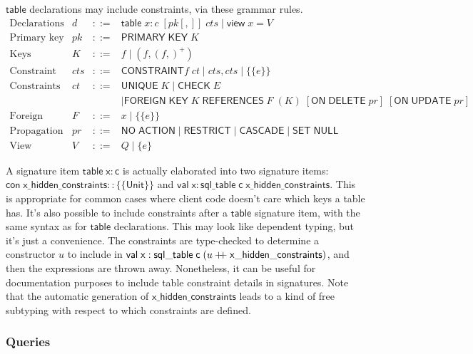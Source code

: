 \documentclass{article}
\newcommand{\mt}[1]{\mathsf{#1}}
\newcommand{\rc}{+ \hspace{-.075in} + \;}
\begin{document}
$\mt{table}$ declarations may include constraints, via these grammar rules.
$$\begin{array}{rrcll}
  \textrm{Declarations} & d &::=& \mt{table} \; x : c \; [pk[,]] \; cts \mid \mt{view} \; x = V \\
  \textrm{Primary key constraints} & pk &::=& \mt{PRIMARY} \; \mt{KEY} \; K \\
  \textrm{Keys} & K &::=& f \mid (f, (f,)^+) \\
  \textrm{Constraint sets} & cts &::=& \mt{CONSTRAINT} f \; ct \mid cts, cts \mid \{\{e\}\} \\
  \textrm{Constraints} & ct &::=& \mt{UNIQUE} \; K \mid \mt{CHECK} \; E \\
  &&& \mid \mt{FOREIGN} \; \mt{KEY} \; K \; \mt{REFERENCES} \; F \; (K) \; [\mt{ON} \; \mt{DELETE} \; pr] \; [\mt{ON} \; \mt{UPDATE} \; pr] \\
  \textrm{Foreign tables} & F &::=& x \mid \{\{e\}\} \\
  \textrm{Propagation modes} & pr &::=& \mt{NO} \; \mt{ACTION} \mid \mt{RESTRICT} \mid \mt{CASCADE} \mid \mt{SET} \; \mt{NULL} \\
  \textrm{View expressions} & V &::=& Q \mid \{e\}
\end{array}$$

A signature item $\mt{table} \; \mt{x} : \mt{c}$ is actually elaborated into two signature items: $\mt{con} \; \mt{x\_hidden\_constraints} :: \{\{\mt{Unit}\}\}$ and $\mt{val} \; \mt{x} : \mt{sql\_table} \; \mt{c} \; \mt{x\_hidden\_constraints}$.  This is appropriate for common cases where client code doesn't care which keys a table has.  It's also possible to include constraints after a $\mt{table}$ signature item, with the same syntax as for $\mt{table}$ declarations.  This may look like dependent typing, but it's just a convenience.  The constraints are type-checked to determine a constructor $u$ to include in $\mt{val} \; \mt{x} : \mt{sql\_table} \; \mt{c} \; (u \rc \mt{x\_hidden\_constraints})$, and then the expressions are thrown away.  Nonetheless, it can be useful for documentation purposes to include table constraint details in signatures.  Note that the automatic generation of $\mt{x\_hidden\_constraints}$ leads to a kind of free subtyping with respect to which constraints are defined.


\subsubsection{Queries}
\end{document}
